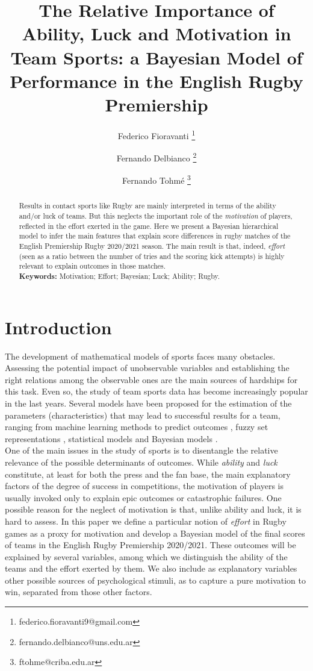 \documentclass[]{article}
\author[1,2]{Federico Fioravanti \footnote{federico.fioravanti9@gmail.com}}
\author[1,3]{Fernando Delbianco \footnote{fernando.delbianco@uns.edu.ar}}
\author[1,3]{Fernando Tohm\'e \footnote{ftohme@criba.edu.ar}}
\affil[1]{Instituto de Matem\'atica de Bah\'ia Blanca, CONICET - UNS, Bah\'{\i}a Blanca, Argentina}
\affil[2]{Departamento de Matem\'atica, Universidad Nacional del Sur, Bah\'ia Blanca, Argentina}
\affil[3]{Departamento de Econom\'ia, Universidad Nacional del Sur, Bah\'ia Blanca, Argentina}
\title{The Relative Importance of Ability, Luck and Motivation in Team Sports: a Bayesian Model of Performance in the English Rugby Premiership}
\date{}
\begin{document}
\maketitle
\begin{abstract}
	Results in contact sports like Rugby are mainly interpreted in terms of the ability and/or luck of teams. But this neglects the important role of the {\em motivation} of players, reflected in the effort exerted in the game. Here we present a Bayesian hierarchical model to infer the main features that explain score differences in rugby matches of the English Premiership Rugby 2020/2021 season. The main result is that, indeed, {\em effort} (seen as a ratio between the number of tries and the scoring kick attempts) is highly relevant to explain outcomes in those matches.\\
	\textbf{Keywords:} Motivation; Effort; Bayesian; Luck; Ability; Rugby.
\end{abstract}
\section{Introduction}
The development of mathematical models of sports faces many obstacles. Assessing the potential impact of unobservable variables and establishing the right relations among the observable ones are the main sources of hardships for this task. Even so, the study of team sports data has become increasingly popular in the last years. Several models have been proposed for the estimation of the parameters (characteristics) that may lead to successful results for a team, ranging  from machine learning methods to predict outcomes \cite{vstrumbelj2012simulating,asif2016play,baboota2019predictive}, fuzzy set representations \cite{hassanniakalager2020conditional}, statistical models \cite{dyte2000ratings,goddard2005regression,boshnakov2017bivariate} and Bayesian models \cite{baio2010bayesian,constantinou2012pi,wetzels2016bayesian,santos2019bayesian}.\\

One of the main issues in the study of sports is to disentangle the relative relevance of the possible determinants of outcomes. While {\em ability} and {\em luck} constitute, at least for both  the press and the fan base, the main explanatory factors of the degree of success in competitions, the motivation of players is usually invoked only to explain epic outcomes or catastrophic failures. One possible reason for the neglect of motivation is that, unlike ability and luck, it is hard to assess. In this paper we define a particular notion of {\em effort} in Rugby games as a proxy for motivation and develop a Bayesian model of the final scores of teams in the English Rugby Premiership 2020/2021. These outcomes will be explained by several variables, among which we distinguish the ability of the teams and the effort exerted by them. We also include as explanatory variables other possible sources of psychological stimuli, as to capture a pure motivation to win, separated from those other factors.\\
\end{document}
